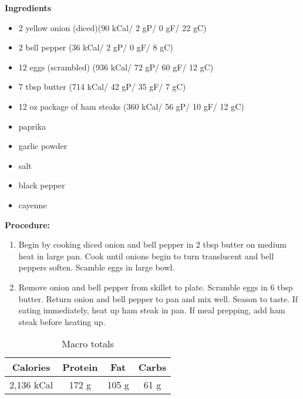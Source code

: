 \documentclass{report}
\begin{document}


\bigskip

\bigskip

\begin{multicols}{2}
\textbf{Ingredients}
\begin{itemize}
\item 2 yellow onion (diced)\quad (90 kCal/ 2 gP/ 0 gF/ 22 gC)
\item 2 bell pepper \quad (36 kCal/ 2 gP/ 0 gF/ 8 gC)
\item 12 eggs (scrambled)  \quad (936 kCal/ 72 gP/ 60 gF/ 12 gC)
\item 7 tbsp butter \quad (714 kCal/ 42 gP/ 35 gF/ 7 gC)
\item 12 oz package of ham steaks \quad (360 kCal/ 56 gP/ 10 gF/ 12 gC)
\item paprika 
\item garlic powder 
\item salt
\item black pepper
\item cayenne



\end{itemize}


\columnbreak
\textbf{Procedure:}
\medskip


\begin{enumerate}
\item Begin by cooking diced onion and bell pepper in 2 tbsp butter on medium heat in large pan. Cook until onions begin to turn translucent and bell peppers soften. Scamble eggs in large bowl. 


\medskip
\item Remove onion and bell pepper from skillet to plate. Scramble eggs in 6 tbsp butter. Return onion and bell pepper to pan and mix well. Season to taste. If eating immediately, heat up ham steak in pan. If meal prepping, add ham steak before heating up. 

 
\end{enumerate}
\end{multicols}


\begin{table}[h!]
  \begin{center}
    \caption{Macro totals}
    \label{tab:table1}
    \begin{tabular}{c|c|c|c} %
      \textbf{Calories} & \textbf{Protein} & \textbf{Fat} & \textbf{Carbs}\\
      \hline
      2,136 kCal & 172 g & 105 g & 61 g\\
    \end{tabular}
  \end{center}
\end{table}

\end{document}
